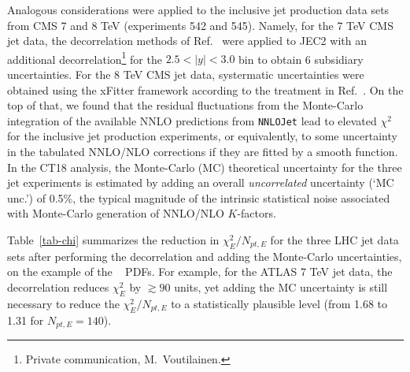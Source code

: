 Analogous considerations were applied to the inclusive jet production data sets from CMS 7 and 8 TeV (experiments 542 and 545).  Namely, for the 7 TeV CMS jet data, the decorrelation methods of
Ref.~\cite{Khachatryan:2014waa} were applied to JEC2 with an additional
decorrelation\footnote{Private communication, M.~Voutilainen.} for the $2.5 < |y| < 3.0$ bin to obtain 6 subsidiary uncertainties. For the 8 TeV CMS jet data, systermatic uncertainties
were obtained using the xFitter framework according to the treatment in Ref.~\cite{Khachatryan:2016kdb}.
On the top of that, we found that the residual fluctuations
from the Monte-Carlo integration of the available NNLO predictions from \texttt{NNLOJet} \cite{Ridder:2015dxa,Gehrmann-DeRidder:2017mvr,Currie:2016bfm,Currie:2017ctp} lead to elevated $\chi^2$ for the inclusive jet production experiments, or equivalently, to some uncertainty in the tabulated NNLO/NLO corrections if they are fitted by a smooth function.   
In the CT18 analysis, the Monte-Carlo (MC) theoretical uncertainty for the three jet experiments is estimated by adding an overall {\it uncorrelated} uncertainty (`MC unc.') of 0.5\%, the typical magnitude of the intrinsic statistical noise associated with Monte-Carlo generation of NNLO/NLO $K$-factors. 
 
Table~\ref{tab-chi} summarizes the reduction in $\chi^2_E/N_{pt,E}$ for the three LHC jet data sets after performing the decorrelation and adding the Monte-Carlo uncertainties, on the example of the \CTHERAII~ PDFs. For example, for the ATLAS 7 TeV jet data, the decorrelation reduces $\chi^2_E$ by $\gtrsim\!\! 90$ units, yet adding the MC uncertainty is still necessary to reduce the $\chi^2_E/N_{pt,E}$ to a statistically plausible level (from 1.68 to 1.31 for $N_{pt,E}=140$). 

